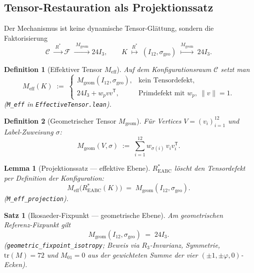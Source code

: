 \documentclass[11pt,a4paper]{article}
\newtheorem{theorem}{Satz}
\newtheorem{definition}{Definition}
\newtheorem{lemma}{Lemma}
\begin{document}
\subsection{Tensor-Restauration als Projektionssatz}
\label{sec:tensor-projection}

Der Mechanismus ist keine dynamische Tensor-Glättung, sondern die Faktorisierung
\[
  \mathcal{C}
  \;\xrightarrow{\;R^*\;}
  \mathcal{F}
  \;\xrightarrow{\;M_{\mathrm{geom}}\;}
  24I_3,
  \qquad
  K
  \;\stackrel{R^*}{\longmapsto}\;
  (I_{12},\sigma_{\mathrm{geo}})
  \;\stackrel{M_{\mathrm{geom}}}{\longmapsto}\;
  24I_3.
\]

\begin{definition}[Effektiver Tensor $M_{\mathrm{eff}}$]
\label{def:m-eff}
Auf dem Konfigurationsraum $\mathcal{C}$ setzt man
\[
  M_{\mathrm{eff}}(K)
  \;:=\;
  \begin{cases}
    M_{\mathrm{geom}}(I_{12},\sigma_{\mathrm{geo}}), & \text{kein Tensordefekt},\\[4pt]
    24I_3+w_pvv^{\mathsf T}, & \text{Primdefekt mit }w_p,\ \|v\|=1.
  \end{cases}
\]
(\texttt{M\_eff} in \texttt{EffectiveTensor.lean}).
\end{definition}

\begin{definition}[Geometrischer Tensor $M_{\mathrm{geom}}$]
\label{def:m-geom}
Für Vertices $V=(v_i)_{i=1}^{12}$ und Label-Zuweisung $\sigma$:
\[
  M_{\mathrm{geom}}(V,\sigma)
  \;:=\;
  \sum_{i=1}^{12} w_{\sigma(i)}\, v_i v_i^{\mathsf T}.
\]
\end{definition}

\begin{lemma}[Projektionssatz — effektive Ebene]
\label{lem:tensor-projection}
$R^*_{\mathrm{EABC}}$ löscht den Tensordefekt per Definition der Konfiguration:
\[
  M_{\mathrm{eff}}\bigl(R^*_{\mathrm{EABC}}(K)\bigr)
  \;=\;
  M_{\mathrm{geom}}(I_{12},\sigma_{\mathrm{geo}}).
\]
(\texttt{M\_eff\_projection}).
\end{lemma}

\begin{theorem}[Ikosaeder-Fixpunkt — geometrische Ebene]
\label{thm:geom-fixpoint}
Am geometrischen Referenz-Fixpunkt gilt
\[
  \boxed{
  M_{\mathrm{geom}}(I_{12},\sigma_{\mathrm{geo}})
  \;=\;
  24I_3
  }.
\]
(\texttt{geometric\_fixpoint\_isotropy}; Beweis via $R_3$-Invarianz,
Symmetrie, $\mathrm{tr}(M)=72$ und $M_{01}=0$ aus der gewichteten Summe der
vier $(\pm1,\pm\varphi,0)$-Ecken).
\end{theorem}
\end{document}
